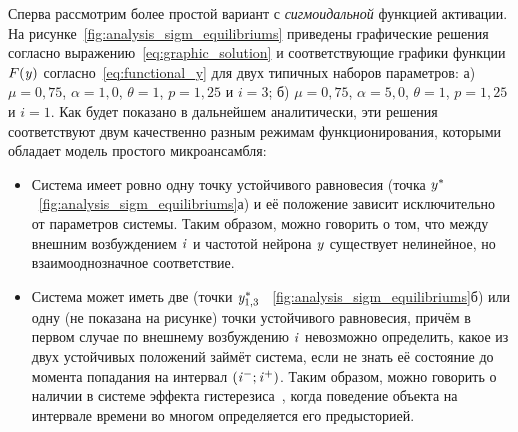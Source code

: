Сперва рассмотрим более простой вариант с \textit{сигмоидальной} функцией активации. На рисунке~\ref{fig:analysis_sigm_equilibriums} приведены графические решения согласно выражению~\eqref{eq:graphic_solution} и соответствующие графики функции $F(\mathit{y})$ согласно~\eqref{eq:functional_y} для двух типичных наборов параметров: а) $\mu = 0,75$, $\alpha = 1,0$, $\theta = 1$, $p = 1,25$ и $i = 3$; б) $\mu = 0,75$, $\alpha = 5,0$, $\theta = 1$, $p = 1,25$ и $i = 1$.
Как будет показано в дальнейшем аналитически, эти решения соответствуют двум качественно разным режимам функционирования, которыми обладает модель простого микроансамбля:
\begin{itemize}
    \item Система имеет ровно одну точку устойчивого равновесия (точка $\mathit{y}^{*}$ \onfigure~\ref{fig:analysis_sigm_equilibriums}а) и её положение зависит исключительно от параметров системы. Таким образом, можно говорить о том, что между внешним возбуждением $\mathit{i}$ и частотой нейрона $\mathit{y}$ существует нелинейное, но взаимооднозначное соответствие.
    \item Система может иметь две (точки $\mathit{y}_{1,3}^{*}$ \onfigure~\ref{fig:analysis_sigm_equilibriums}б) или одну (не показана на рисунке) точки устойчивого равновесия, причём в первом случае по внешнему возбуждению $\mathit{i}$ невозможно определить, какое из двух устойчивых положений займёт система, если не знать её состояние до момента попадания на интервал $\left(\mathit{i}^{-}; \mathit{i}^{+}\right)$. Таким образом, можно говорить о наличии в системе эффекта гистерезиса~\cite{Krasnoselsky1983}, когда поведение объекта на интервале времени во многом определяется его предысторией.
\end{itemize}

